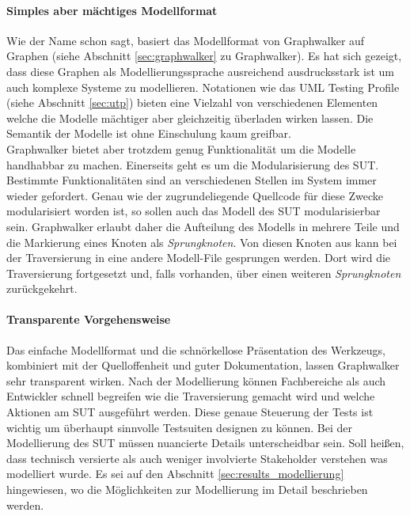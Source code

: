 \paragraph{Simples aber mächtiges Modellformat} Wie der Name schon sagt, basiert das Modellformat von Graphwalker auf Graphen (siehe Abschnitt \ref{sec:graphwalker} zu Graphwalker). Es hat sich gezeigt, dass diese Graphen als Modellierungssprache ausreichend ausdrucksstark ist um auch komplexe Systeme zu modellieren. Notationen wie das UML Testing Profile (siehe Abschnitt \ref{sec:utp}) bieten eine Vielzahl von verschiedenen Elementen welche die Modelle mächtiger aber gleichzeitig überladen wirken lassen. Die Semantik der Modelle ist ohne Einschulung kaum greifbar.\\
Graphwalker bietet aber trotzdem genug Funktionalität um die Modelle handhabbar zu machen. Einerseits geht es um die Modularisierung des SUT. Bestimmte Funktionalitäten sind an verschiedenen Stellen im System immer wieder gefordert. Genau wie der zugrundeliegende Quellcode für diese Zwecke modularisiert worden ist, so sollen auch das Modell des \Gls{SUT} modularisierbar sein. Graphwalker erlaubt daher die Aufteilung des Modells in mehrere Teile und die Markierung eines Knoten als \textit{Sprungknoten}. Von diesen Knoten aus kann bei der Traversierung in eine andere Modell-File gesprungen werden. Dort wird die Traversierung fortgesetzt und, falls vorhanden, über einen weiteren \textit{Sprungknoten} zurückgekehrt.

\paragraph{Transparente Vorgehensweise} Das einfache Modellformat und die schnörkellose Präsentation des Werkzeugs, kombiniert mit der Quelloffenheit und guter Dokumentation, lassen Graphwalker sehr transparent wirken. Nach der Modellierung können Fachbereiche als auch Entwickler schnell begreifen wie die Traversierung gemacht wird und welche Aktionen am \Gls{SUT} ausgeführt werden. Diese genaue Steuerung der Tests ist wichtig um überhaupt sinnvolle Testsuiten designen zu können. Bei der Modellierung des \Gls{SUT} müssen nuancierte Details unterscheidbar sein. Soll heißen, dass technisch versierte als auch weniger involvierte Stakeholder verstehen was modelliert wurde. Es sei auf den Abschnitt \ref{sec:results_modellierung} hingewiesen, wo die Möglichkeiten zur Modellierung im Detail beschrieben werden.


